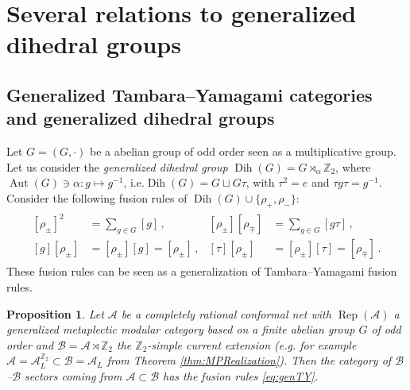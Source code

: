 \documentclass[twoside,11pt,reqno]{amsart}
\makeatletter
\newtheorem{prop}[thm]{Proposition}
\theoremstyle{definition}
\theoremstyle{remark}
\newcommand{\cB}{\mathcal{B}}
\newcommand{\A}{\mathcal{A}}
\newcommand{\ZZ}{\mathbb{Z}}
\DeclareMathOperator{\Rep}{Rep}
\DeclareMathOperator{\Aut}{Aut}
\DeclareRobustCommand{\eg}{e.g.\@\xspace}
\DeclareRobustCommand{\ie}{i.e.\@\xspace}
\DeclareMathOperator{\Dih}{Dih}
\newcommand{\myemph}[1]{\emph{#1}}
\makeatother
\begin{document}
\section{Several relations to generalized dihedral groups}
\label{sec:Dihedral}
\subsection{Generalized Tambara--Yamagami categories and generalized dihedral 
groups}
\label{ssec:GenTY}
Let $G=(G,\cdot)$ be a abelian group of odd order seen as a multiplicative
group.
Let us consider the \myemph{generalized dihedral group} 
$\Dih(G)=G\rtimes_{\alpha}\ZZ_2$, where 
$\Aut(G)\ni\alpha\colon g\mapsto g^{-1}$, 
\ie $\Dih(G)=G\sqcup G\tau$, with $\tau^2=e$ and $\tau g \tau = g^{-1}$.
Consider the following fusion rules of $\Dih(G)\cup \{\rho_+,\rho_-\}$:
\begin{gather}
  \label{eq:genTY}
    \begin{aligned}
      [\rho_\pm]^2&=\sum_{g\in G}[g]\,,&
      [\rho_\pm][\rho_\mp]&=\sum_{g\in G}[g\tau]\,,\\
      [g][\rho_\pm]&=[\rho_\pm][g] =[\rho_\pm]\,,&
     [\tau][\rho_\pm]&=[\rho_\pm][\tau]=[\rho_\mp]\,.
  \end{aligned}
\end{gather}
These fusion rules can be seen as a generalization of Tambara--Yamagami fusion
rules.
\begin{prop} 
  Let $\A$ be a completely rational conformal net with 
  $\Rep(\A)$ a generalized metaplectic modular category based on a finite
  abelian group $G$ of odd order and $\cB=\A\rtimes\ZZ_2$ the $\ZZ_2$-simple
  current extension (\eg for example $\A=\A_L^{\ZZ_2}\subset\cB= \A_L$ from 
  Theorem \ref{thm:MPRealization}).
  Then the category %
%
  of $\cB$--$\cB$ sectors coming from $\A\subset \cB$
  has the fusion rules \eqref{eq:genTY}.
\end{prop}
\end{document}
